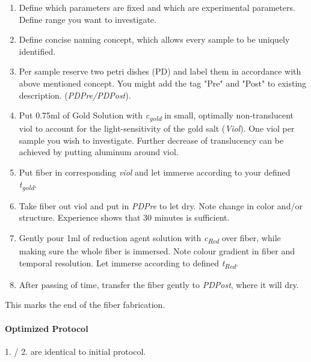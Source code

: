 \begin{enumerate}
    \item Define which parameters are fixed and which are experimental parameters. Define range you want to investigate.
    
    \item Define concise naming concept, which allows every sample to be uniquely identified.
    
    \item Per sample reserve two petri dishes (PD) and label them in accordance with above mentioned concept. You might add the tag "Pre" and "Post" to existing description. (\textit{PDPre/PDPost}).
    
    \item Put 0.75ml of Gold Solution with \textit{c\textsubscript{gold}} in small, optimally non-translucent viol to account for the light-sensitivity of the gold salt (\textit{Viol}). One viol per sample you wish to investigate. Further decrease of translucency can be achieved by putting aluminum around viol.
    
    \item Put fiber in corresponding \textit{viol} and let immerse according to your defined \textit{t\textsubscript{gold}}.
    \item Take fiber out viol and put in \textit{PDPre} to let dry. Note change in color and/or structure. Experience shows that 30 minutes is sufficient.
    
    \item Gently pour 1ml of reduction agent solution with \textit{c\textsubscript{Red}} over fiber, while making sure the whole fiber is immersed. Note colour gradient in fiber and temporal resolution. Let immerse according to defined \textit{t\textsubscript{Red}}.
    
    \item After passing of time, transfer the fiber gently to \textit{PDPost}, where it will dry.
    \end{enumerate}
    
    \begin{center}
        This marks the end of the fiber fabrication.
    \end{center}


\paragraph{Optimized Protocol} 

1. / 2. are identical to initial protocol.

